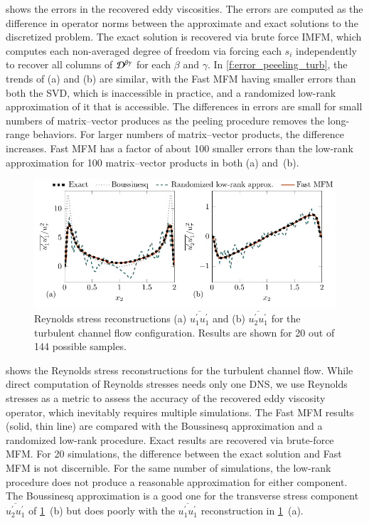  shows the errors in the recovered eddy viscosities.
The errors are computed as the difference in operator norms between the approximate and exact solutions to the discretized problem. 
The exact solution is recovered via brute force IMFM, which computes each non-averaged degree of freedom via forcing each $s_i$ independently to recover all columns of $\mathcal{D}^{\beta\gamma}$  for each $\beta$ and $\gamma$.
In \cref{f:error_peeeling_turb}, the trends of (a) and (b) are similar, with the Fast MFM having smaller errors than both the SVD, which is inaccessible in practice, and a randomized low-rank approximation of it that is accessible.
The differences in errors are small for small numbers of matrix--vector produces as the peeling procedure removes the long-range behaviors.
For larger numbers of matrix--vector products, the difference increases.
Fast MFM has a factor of about 100 smaller errors than the low-rank approximation for 100 matrix--vector products in both (a) and~(b).

\begin{figure}
    \centering
    \includegraphics[scale=1]{figures/turbulent-reconstructions.pdf}
    \caption{
        Reynolds stress reconstructions (a) $\overline{u_1^\prime u_1^\prime}$ and (b) $\overline{u_2^\prime u_1^\prime}$ for the turbulent channel flow configuration.
        Results are shown for 20 out of 144 possible samples.
    }
    \label{f:reconstructions}
\end{figure}

 shows the Reynolds stress reconstructions for the turbulent channel flow. 
While direct computation of Reynolds stresses needs only one DNS, we use Reynolds stresses as a metric to assess the accuracy of the recovered eddy viscosity operator, which inevitably requires multiple simulations.
The Fast MFM results (solid, thin line) are compared with the Boussinesq approximation and a randomized low-rank procedure.
Exact results are recovered via brute-force MFM.
For 20 simulations, the difference between the exact solution and Fast MFM is not discernible.
For the same number of simulations, the low-rank procedure does not produce a reasonable approximation for either component.
The Boussinesq approximation is a good one for the transverse stress component $\overline{u_2^\prime u_1^\prime}$ of \cref{f:reconstructions}~(b) but does poorly with the $\overline{u_1^\prime u_1^\prime}$ reconstruction in \cref{f:reconstructions}~(a).

